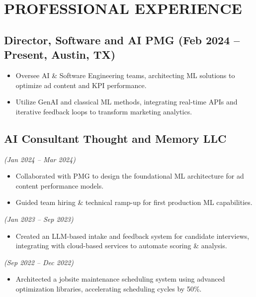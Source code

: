 \documentclass[11pt]{article}
\begin{document}
\section*{PROFESSIONAL EXPERIENCE}

\subsection*{Director, Software and AI \hfill PMG (Feb 2024 -- Present, Austin, TX)}
\begin{itemize}[leftmargin=*]
  \item Oversee AI \& Software Engineering teams, architecting ML solutions to optimize ad content and KPI performance.
  \item Utilize GenAI and classical ML methods, integrating real-time APIs and iterative feedback loops to transform marketing analytics.
\end{itemize}

\subsection*{AI Consultant \hfill Thought and Memory LLC}
\textit{(Jan 2024 -- Mar 2024)}
\begin{itemize}[leftmargin=*]
  \item Collaborated with PMG to design the foundational ML architecture for ad content performance models.
  \item Guided team hiring \& technical ramp-up for first production ML capabilities.
\end{itemize}

\textit{(Jan 2023 -- Sep 2023)}
\begin{itemize}[leftmargin=*]
  \item Created an LLM-based intake and feedback system for candidate interviews, integrating with cloud-based services to automate scoring \& analysis.
\end{itemize}

\textit{(Sep 2022 -- Dec 2022)}
\begin{itemize}[leftmargin=*]
  \item Architected a jobsite maintenance scheduling system using advanced optimization libraries, accelerating scheduling cycles by 50\%.
\end{itemize}
\end{document}
